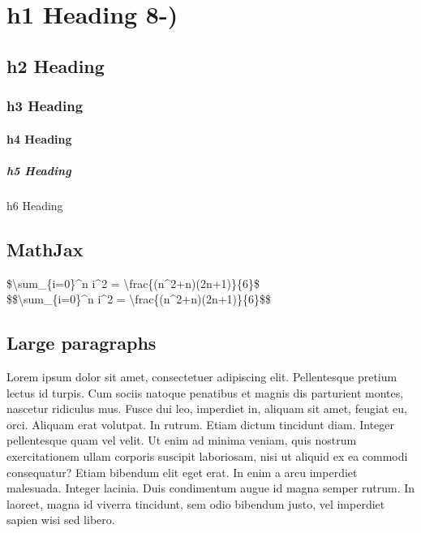 \documentclass[]{article}
\date{}
\let\oldparagraph\paragraph
\renewcommand{\paragraph}[1]{\oldparagraph{#1}\mbox{}}
\let\oldsubparagraph\subparagraph
\renewcommand{\subparagraph}[1]{\oldsubparagraph{#1}\mbox{}}
\begin{document}
\section{h1 Heading 8-)}\label{h1-heading-8-}

\subsection{h2 Heading}\label{h2-heading}

\subsubsection{h3 Heading}\label{h3-heading}

\paragraph{h4 Heading}\label{h4-heading}

\subparagraph{h5 Heading}\label{h5-heading}

h6 Heading

\subsection{MathJax}\label{mathjax}

\$\textbackslash{}sum\_\{i=0\}\^{}n i\^{}2 =
\textbackslash{}frac\{(n\^{}2+n)(2n+1)\}\{6\}\$\\
\$\$\textbackslash{}sum\_\{i=0\}\^{}n i\^{}2 =
\textbackslash{}frac\{(n\^{}2+n)(2n+1)\}\{6\}\$\$

\subsection{Large paragraphs}\label{large-paragraphs}

Lorem ipsum dolor sit amet, consectetuer adipiscing elit. Pellentesque
pretium lectus id turpis. Cum sociis natoque penatibus et magnis dis
parturient montes, nascetur ridiculus mus. Fusce dui leo, imperdiet in,
aliquam sit amet, feugiat eu, orci. Aliquam erat volutpat. In rutrum.
Etiam dictum tincidunt diam. Integer pellentesque quam vel velit. Ut
enim ad minima veniam, quis nostrum exercitationem ullam corporis
suscipit laboriosam, nisi ut aliquid ex ea commodi consequatur? Etiam
bibendum elit eget erat. In enim a arcu imperdiet malesuada. Integer
lacinia. Duis condimentum augue id magna semper rutrum. In laoreet,
magna id viverra tincidunt, sem odio bibendum justo, vel imperdiet
sapien wisi sed libero.
\end{document}
